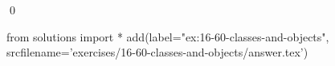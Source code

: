 
\begin{ex}
  \label{ex:16-60-classes-and-objects}
  
  \qed
\end{ex}
\begin{python0}
from solutions import *
add(label="ex:16-60-classes-and-objects",
    srcfilename='exercises/16-60-classes-and-objects/answer.tex')
\end{python0}
